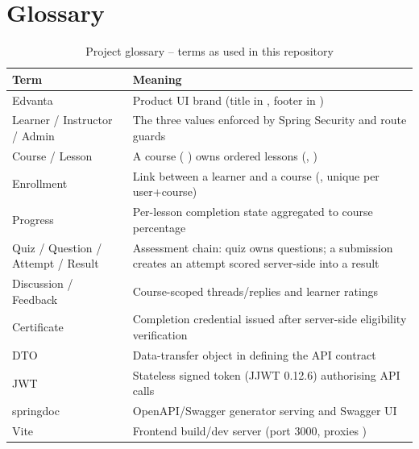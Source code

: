 \section{Glossary}
\label{sec:glossary}

\begin{table}[H]
\centering
\caption{Project glossary -- terms as used in this repository}
\label{tab:glossary}
\begin{tabular}{@{}L{3.6cm}L{10.6cm}@{}}
\toprule
\textbf{Term} & \textbf{Meaning} \\
\midrule
Edvanta & Product UI brand (title in , footer in ) \\
Learner / Instructor / Admin & The three  values enforced by Spring Security and route guards \\
Course / Lesson & A course ( ) owns ordered lessons (, ) \\
Enrollment & Link between a learner and a course (, unique per user+course) \\
Progress & Per-lesson completion state aggregated to course percentage \\
Quiz / Question / Attempt / Result & Assessment chain: quiz owns questions; a submission creates an attempt scored server-side into a result \\
Discussion / Feedback & Course-scoped threads/replies and learner ratings \\
Certificate & Completion credential issued after server-side eligibility verification \\
DTO & Data-transfer object in  defining the API contract \\
JWT & Stateless signed token (JJWT 0.12.6) authorising API calls \\
springdoc & OpenAPI/Swagger generator serving  and Swagger UI \\
Vite & Frontend build/dev server (port 3000, proxies ) \\
\bottomrule
\end{tabular}
\end{table}
